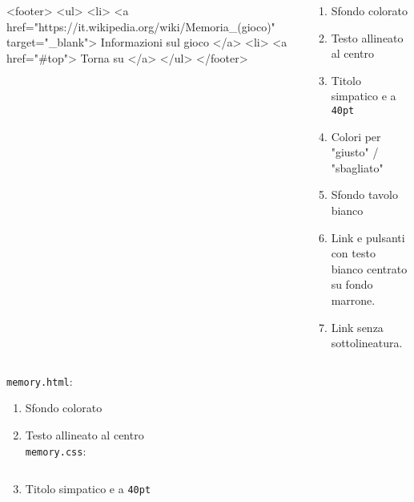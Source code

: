 \begin{frame}[fragile]
\begin{exercise}
\begin{columns}
\begin{column}{.45\textwidth}
{<footer>
    <ul>
        <li> <a href="https://it.wikipedia.org/wiki/Memoria_(gioco)" target="_blank"> Informazioni sul gioco </a>
        <li> <a href="#top"> Torna su </a>
    </ul>
</footer>}
      \end{column}
      \begin{column}{.45\textwidth}
        \begin{enumerate}
          \item Sfondo colorato
          \item Testo allineato al centro
          \item Titolo simpatico e a \texttt{40pt}
          \item Colori per "giusto" / "sbagliato"
          \item Sfondo tavolo bianco
          \item Link e pulsanti con testo bianco centrato su fondo marrone.
          \item Link senza sottolineatura.
        \end{enumerate}
      \end{column}
    \end{columns}
  \end{exercise}
\end{frame}

\begin{frame}[fragile]\transfade
  \begin{sol}\centering
    \texttt{memory.html}:
    \begin{enumerate}
      \item Sfondo colorato
      \item Testo allineato al centro\\
      \texttt{memory.css}:
      \makeatletter
      \inputminted[breaklines, firstline=4, lastline=7]{css}{\html@dir/\jobname _\thehtml@count.html}
      \item Titolo simpatico e a \texttt{40pt}
      \inputminted[breaklines, firstline=9, lastline=13]{css}{\html@dir/\jobname _\thehtml@count.html}
      \makeatother
    \end{enumerate}
  \end{sol}
\end{frame}

